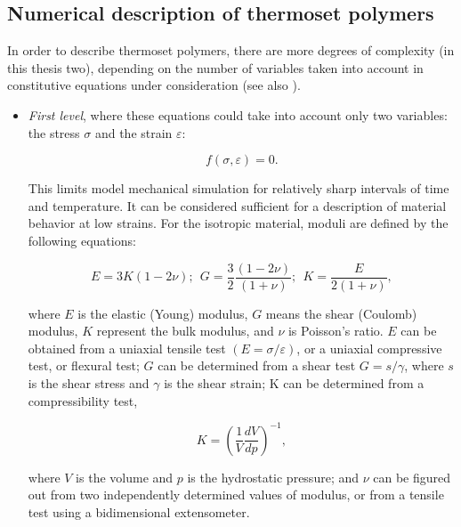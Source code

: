 \subsection{Numerical description of thermoset polymers}\label{sec:poly_complexity}
In order to describe thermoset polymers, there are more degrees of complexity (in this thesis two), depending on the number of variables taken into account in constitutive equations under consideration (see also \cite{thermosetting_polymers}). 
\begin{itemize}
	
	\item 
	\textit{First level}, where these equations could take into account only two variables: the stress $\sigma$ and the strain $\varepsilon$:
	
	\begin{equation}\label{eq2:first_level}
		f(\sigma,\varepsilon)=0.
	\end{equation}
	
	This limits model mechanical simulation for relatively sharp intervals of time and temperature. It can be considered sufficient for a description of material behavior at low strains. For the isotropic material, moduli are defined by the following equations:
	
	\begin{equation}\label{eq:basic_moduli}
		E = 3K(1-2\nu); ~~G=\dfrac{3}{2}\dfrac{(1-2\nu)}{(1+\nu)};~~ K=\frac{E}{2(1+\nu)},
	\end{equation}
	
	where $E$ is the elastic (Young) modulus, $G$ means the shear (Coulomb) modulus, $K$ represent the bulk modulus, and $\nu$ is Poisson's ratio. $E$ can be obtained from a uniaxial tensile test $(E=\sigma/\varepsilon)$, or a uniaxial compressive test, or flexural test; $G$ can be determined from a shear test $G=s/\gamma$, where $s$ is the shear stress and $\gamma$ is the shear strain; K can be determined from a compressibility test, 
	
	\begin{equation}\label{eq:K_moduli}
		K=\left(\dfrac{1}{V}\dfrac{dV}{dp}\right)^{-1},
	\end{equation}
	
	where $V$ is the volume and $p$ is the hydrostatic pressure; and $\nu$ can be figured out from two independently determined values of modulus, or from a tensile test using a bidimensional extensometer. 
	

\end{itemize}
